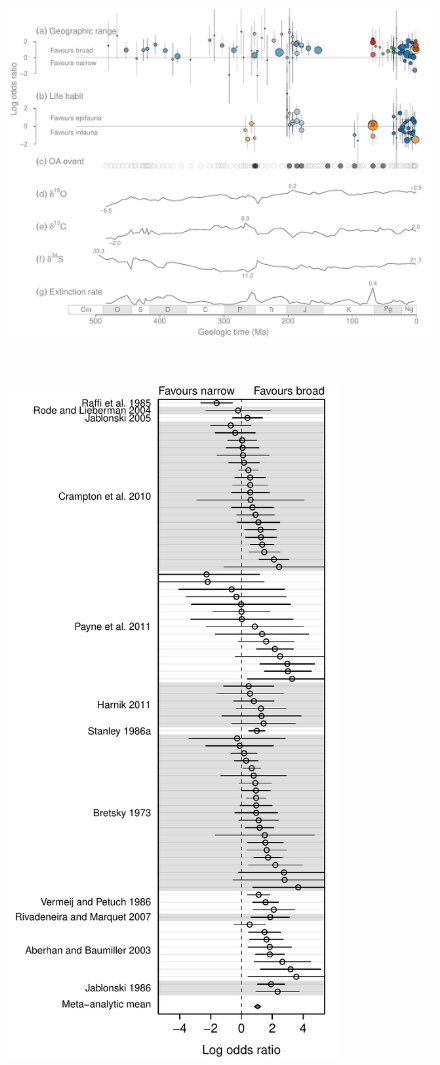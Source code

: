 \documentclass[12pt]{article}
\begin{document}
\begin{figure}[htbp]
  \centering
  \includegraphics[height=4in]{selectivity-data-overview.pdf}
  \caption{}
\end{figure}

\clearpage

\begin{figure}[htbp]
  \centering
  \includegraphics[height=7in]{broad_narrow_rma.pdf}
  \caption{}
\end{figure}
\clearpage
\end{document}
